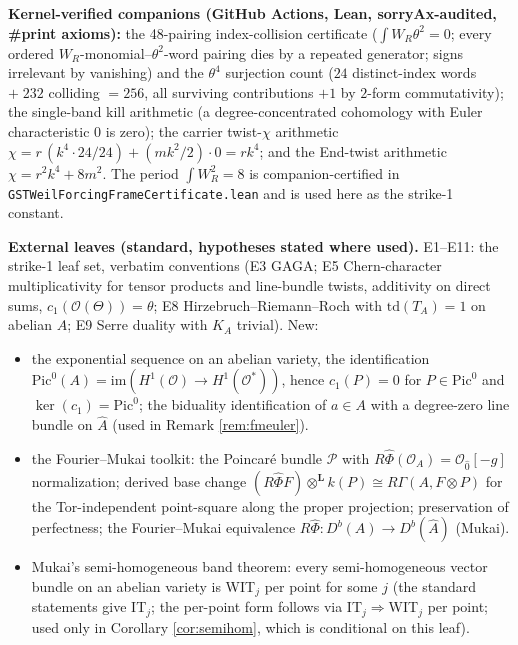 \documentclass[11pt]{article}
\begin{document}
\noindent\textbf{Kernel-verified companions (GitHub Actions, Lean, sorryAx-audited, \#print axioms):}
the 48-pairing index-collision certificate ($\int W_R\theta^2=0$; every ordered
$W_R$-monomial--$\theta^2$-word pairing dies by a repeated generator; signs irrelevant by vanishing) and
the $\theta^4$ surjection count ($24$ distinct-index words $+\;232$ colliding $=256$, all surviving
contributions $+1$ by $2$-form commutativity); the single-band kill arithmetic (a degree-concentrated
cohomology with Euler characteristic $0$ is zero); the carrier twist-$\chi$ arithmetic
$\chi=r\,(k^4\cdot24/24)+(mk^2/2)\cdot0=rk^4$; and the End-twist arithmetic
$\chi=r^2k^4+8m^2$. The period $\int W_R^2=8$ is companion-certified in
\texttt{GSTWeilForcingFrameCertificate.lean} and is used here as the strike-1 constant.

\textbf{External leaves (standard, hypotheses stated where used).} E1--E11: the strike-1 leaf set,
verbatim conventions (E3 GAGA; E5 Chern-character multiplicativity for tensor products and line-bundle
twists, additivity on direct sums, $c_1(\mathcal{O}(\Theta))=\theta$; E8 Hirzebruch--Riemann--Roch with
$\mathrm{td}(T_A)=1$ on abelian $A$; E9 Serre duality with $K_A$ trivial). New:
\begin{itemize}[itemsep=1pt]
\item[E12] the exponential sequence on an abelian variety, the identification
$\mathrm{Pic}^0(A)=\mathrm{im}(H^1(\mathcal{O})\to H^1(\mathcal{O}^\ast))$, hence
$c_1(P)=0$ for $P\in\mathrm{Pic}^0$ and $\ker(c_1)=\mathrm{Pic}^0$; the biduality identification of
$a\in A$ with a degree-zero line bundle on $\hat A$ (used in Remark \ref{rem:fmeuler}).
\item[E13] the Fourier--Mukai toolkit: the Poincar\'e bundle $\mathcal{P}$ with
$R\widehat\Phi(\mathcal{O}_A)=\mathcal{O}_{\hat0}[-g]$ normalization; derived base change
$(R\widehat\Phi F)\otimes^{\mathbf{L}}k(P)\cong R\Gamma(A,F\otimes P)$ for the Tor-independent
point-square along the proper projection; preservation of perfectness; the Fourier--Mukai equivalence
$R\widehat\Phi:D^b(A)\to D^b(\hat A)$ (Mukai).
\item[E14] Mukai's semi-homogeneous band theorem: every semi-homogeneous vector bundle on an abelian
variety is WIT$_j$ per point for some $j$ (the standard statements give IT$_j$; the per-point form
follows via IT$_j\Rightarrow$WIT$_j$ per point; used only in Corollary \ref{cor:semihom}, which is
conditional on this leaf).
\end{itemize}
\end{document}
